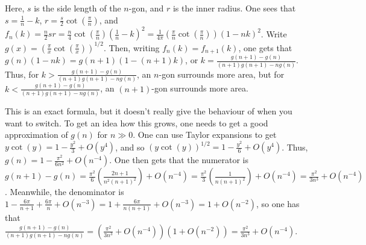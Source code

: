 \documentclass[11pt]{article}
\theoremstyle{definition}
\begin{document}
Here, $s$ is the side length of the $n$-gon, and $r$ is the inner radius.  One sees that $s = \frac{1}{n} - k$, $r = \frac{s}{2}\cot\left(\frac{\pi}{n}\right)$, and $f_n(k) = \frac{n}{2}sr = \frac{n}{4}\cot\left(\frac{\pi}{n}\right)\left(\frac{1}{n} - k\right)^2 = \frac{1}{4\pi}\left(\frac{\pi}{n}\cot\left(\frac{\pi}{n}\right)\right)(1-nk)^2$.  Write $g(x) = \left(\frac{\pi}{x}\cot\left(\frac{\pi}{x}\right)\right)^{1/2}$.  Then, writing $f_n(k) = f_{n+1}(k)$, one gets that $g(n)(1-nk) = g(n+1)(1-(n+1)k)$, or $k = \frac{g(n+1) - g(n)}{(n+1)g(n+1) - ng(n)}$.  Thus, for $k >  \frac{g(n+1) - g(n)}{(n+1)g(n+1) - ng(n)}$, an $n$-gon surrounds more area, but for $k <  \frac{g(n+1) - g(n)}{(n+1)g(n+1) - ng(n)}$, an $(n+1)$-gon surrounds more area.

This is an exact formula, but it doesn't really give the behaviour of when you want to switch.  To get an idea how this grows, one needs to get a good approximation of $g(n)$ for $n \gg 0$.  One can use Taylor expansions to get $y\cot(y) = 1 - \frac{y^2}{3} + O(y^4)$, and so $\left(y\cot(y)\right)^{1/2} = 1 - \frac{y^2}{6} + O(y^4)$.  Thus, $g(n) = 1 - \frac{\pi^2}{6n^2} + O(n^{-4})$.  One then gets that the numerator is $g(n+1)-g(n) = \frac{\pi^2}{6}\left(\frac{2n+1}{n^2(n+1)^2}\right) + O(n^{-4}) = \frac{\pi^2}{3}\left(\frac{1}{n(n+1)^2}\right) + O(n^{-4}) = \frac{\pi^2}{3n^3} + O(n^{-4})$.  Meanwhile, the denominator is $1-\frac{6\pi}{n+1} + \frac{6\pi}{n} + O(n^{-3}) = 1 + \frac{6\pi}{n(n+1)} + O(n^{-3}) = 1+O(n^{-2})$, so one has that $ \frac{g(n+1) - g(n)}{(n+1)g(n+1) - ng(n)} = \left(\frac{\pi^2}{3n^3} + O(n^{-4})\right)(1+O(n^{-2})) = \frac{\pi^2}{3n^3} + O(n^{-4})$.
\end{document}
